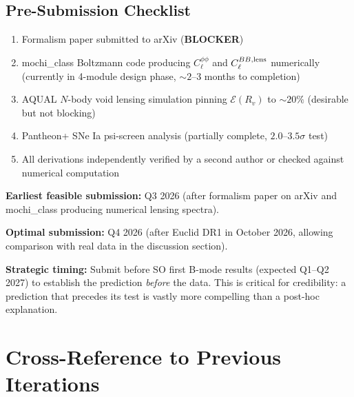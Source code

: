 \documentclass[11pt,a4paper]{article}
\begin{document}
\subsection{Pre-Submission Checklist}

\begin{enumerate}[label=\arabic*.]
\item Formalism paper submitted to arXiv (\textbf{BLOCKER})
\item mochi\_class Boltzmann code producing $C_\ell^{\phi\phi}$ and
  $C_\ell^{BB,\rm lens}$ numerically (currently in 4-module design
  phase, $\sim 2$--$3$ months to completion)
\item AQUAL $N$-body void lensing simulation pinning $\mathcal{E}(R_v)$
  to $\sim 20\%$ (desirable but not blocking)
\item Pantheon+ SNe Ia psi-screen analysis (partially complete,
  $2.0$--$3.5\sigma$ test)
\item All derivations independently verified by a second author or
  checked against numerical computation
\end{enumerate}

\begin{tcolorbox}[colback=yellow!5!white, colframe=yellow!50!black,
  title=\textbf{Submission Timeline}]
\textbf{Earliest feasible submission:} Q3 2026 (after formalism paper
on arXiv and mochi\_class producing numerical lensing spectra).

\textbf{Optimal submission:} Q4 2026 (after Euclid DR1 in October 2026,
allowing comparison with real data in the discussion section).

\textbf{Strategic timing:} Submit before SO first B-mode results
(expected Q1--Q2 2027) to establish the prediction \emph{before} the
data.  This is critical for credibility: a prediction that precedes
its test is vastly more compelling than a post-hoc explanation.
\end{tcolorbox}


\section*{Cross-Reference to Previous Iterations}
\end{document}
